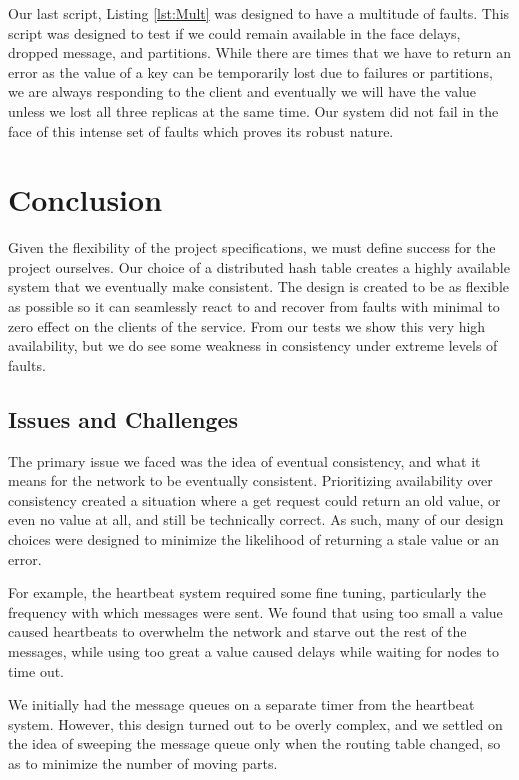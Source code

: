 \documentclass[11pt]{article}
\begin{document}
Our last script, Listing \ref{lst:Mult} was designed to have a multitude of faults. This script was designed to test if we could remain available in the face delays, dropped message, and partitions. While there are times that we have to return an error as the value of a key can be temporarily lost due to failures or partitions, we are always responding to the client and eventually we will have the value unless we lost all three replicas at the same time. Our system did not fail in the face of this intense set of faults which proves its robust nature.

\section{Conclusion}\label{sec:Conc}

Given the flexibility of the project specifications, we must define success for the project ourselves. Our choice of a distributed hash table creates a highly available system that we eventually make consistent. The design is created to be as flexible as possible so it can seamlessly react to and recover from faults with minimal to zero effect on the clients of the service. From our tests we show this very high availability, but we do see some weakness in consistency under extreme levels of faults.

\subsection{Issues and Challenges}

The primary issue we faced was the idea of eventual consistency, and what it means for the network to be eventually consistent. Prioritizing availability over consistency created a situation where a get request could return an old value, or even no value at all, and still be technically correct. As such, many of our design choices were designed to minimize the likelihood of returning a stale value or an error.

For example, the heartbeat system required some fine tuning, particularly the frequency with which messages were sent. We found that using too small a value caused heartbeats to overwhelm the network and starve out the rest of the messages, while using too great a value caused delays while waiting for nodes to time out.

We initially had the message queues on a separate timer from the heartbeat system. However, this design turned out to be overly complex, and we settled on the idea of sweeping the message queue only when the routing table changed, so as to minimize the number of moving parts.
\end{document}
